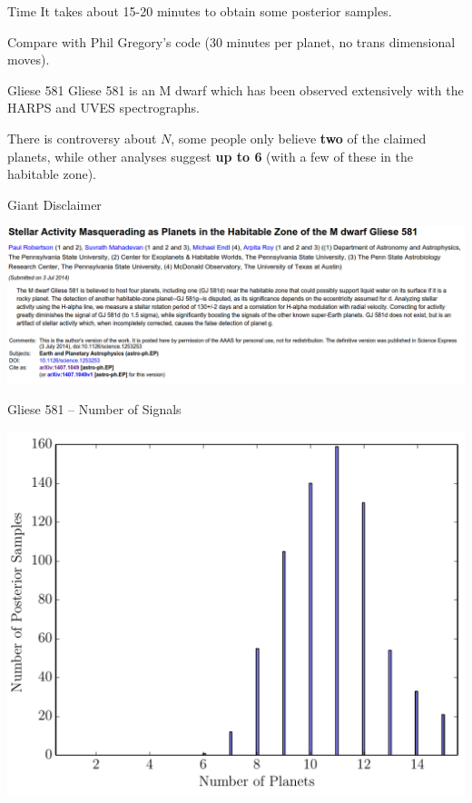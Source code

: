 \begin{frame}[t]{Time}
It takes about 15-20 minutes to obtain some posterior samples.

Compare with Phil Gregory's code (30 minutes per planet, no trans dimensional
moves).
\end{frame}

\begin{frame}[t]{Gliese 581}
Gliese 581 is an M dwarf which has been observed extensively with the HARPS
and UVES spectrographs.

\vspace{20pt}

There is controversy about $N$, some people only
believe {\bf two} of the claimed planets, while other analyses suggest
{\bf up to 6} (with a few of these in the habitable zone).
\end{frame}

\begin{frame}[t]{Giant Disclaimer}
\begin{center}
\includegraphics[scale=0.25]{robertson.png}
\end{center}
\end{frame}

\begin{frame}[t]{Gliese 581 -- Number of Signals}
\begin{center}
\includegraphics[scale=0.35]{ExoplanetFigures/gliese581_N.pdf}
\end{center}
\end{frame}


